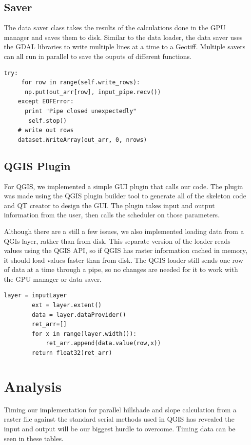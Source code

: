 \documentclass[journal]{IEEEtran}
\begin{document}
    \subsection{Saver}
    The data saver class takes the results of the calculations done in the GPU
    manager and saves them to disk. Similar to the data loader, the data saver
    uses the GDAL libraries to write multiple lines at a time to a Geotiff.
    Multiple savers can all run in parallel to save the ouputs of different
    functions.
\break
    \begin{Verbatim}[frame=single, gobble=4]
    try:
     for row in range(self.write_rows):
      np.put(out_arr[row], input_pipe.recv())
    except EOFError:
      print "Pipe closed unexpectedly"
       self.stop()
    # write out rows
    dataset.WriteArray(out_arr, 0, nrows)
\end{Verbatim}


    \subsection{QGIS Plugin}
    For QGIS, we implemented a simple GUI plugin that calls our code. The plugin
    was made using the QGIS plugin builder tool to generate all of the skeleton
    code and QT creator to design the GUI. The plugin takes input and output
    information from the user, then calls the scheduler on those parameters.

    Although there are a still a few issues, we also implemented loading data
    from a QGIs layer, rather than from disk. This separate version of the loader
    reads values using the QGIS API, so if QGIS has raster information cached in
    memory, it should load values faster than from disk. The QGIS loader still
    sends one row of data at a time through a pipe, so no changes are needed
    for it to work with the GPU manager or data saver.

\begin{Verbatim}[frame=single, gobble=7]
        layer = inputLayer
        ext = layer.extent()
        data = layer.dataProvider()
        ret_arr=[]
        for x in range(layer.width()):
            ret_arr.append(data.value(row,x))
        return float32(ret_arr)
\end{Verbatim}
    
\section{Analysis}
Timing our implementation for parallel hillshade and slope calculation from a raster file
against the standard serial methods used in QGIS has revealed the input and
output will be our biggest hurdle to overcome. Timing data can be seen in these
tables.
\end{document}
